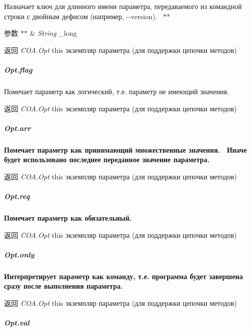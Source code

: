 Назначает ключ для длинного имени параметра, передаваемого из командной строки с двойным дефисом (например, {\ttfamily -\/-\/version}).~\newline
 $\ast$$\ast$
\begin{DoxyParams}{参数}
{\em $\ast$$\ast$} & {\itshape String} {\ttfamily \+\_\+long}~\newline
 {\bfseries }\\
\hline
\end{DoxyParams}
\begin{DoxyReturn}{返回}
{\bfseries } {\itshape C\+O\+A.\+Opt} {\ttfamily this} экземпляр параметра (для поддержки цепочки методов)
\end{DoxyReturn}
\subparagraph*{Opt.\+flag}

Помечает параметр как логический, т.\+е. параметр не имеющий значения.~\newline
 {\bfseries \begin{DoxyReturn}{返回}
{\itshape C\+O\+A.\+Opt} {\ttfamily this} экземпляр параметра (для поддержки цепочки методов)
\end{DoxyReturn}
\subparagraph*{Opt.\+arr}}

{\bfseries  Помечает параметр как принимающий множественные значения.~\newline
 Иначе будет использовано последнее переданное значение параметра.~\newline
 {\bfseries \begin{DoxyReturn}{返回}
{\itshape C\+O\+A.\+Opt} {\ttfamily this} экземпляр параметра (для поддержки цепочки методов)
\end{DoxyReturn}
\subparagraph*{Opt.\+req}}}

{\bfseries {\bfseries  Помечает параметр как обязательный.~\newline
 {\bfseries \begin{DoxyReturn}{返回}
{\itshape C\+O\+A.\+Opt} {\ttfamily this} экземпляр параметра (для поддержки цепочки методов)
\end{DoxyReturn}
\subparagraph*{Opt.\+only}}}}

{\bfseries {\bfseries {\bfseries  Интерпретирует параметр как команду, т.\+е. программа будет завершена сразу после выполнения параметра.~\newline
 {\bfseries \begin{DoxyReturn}{返回}
{\itshape C\+O\+A.\+Opt} {\ttfamily this} экземпляр параметра (для поддержки цепочки методов)
\end{DoxyReturn}
\subparagraph*{Opt.\+val}}}}}

